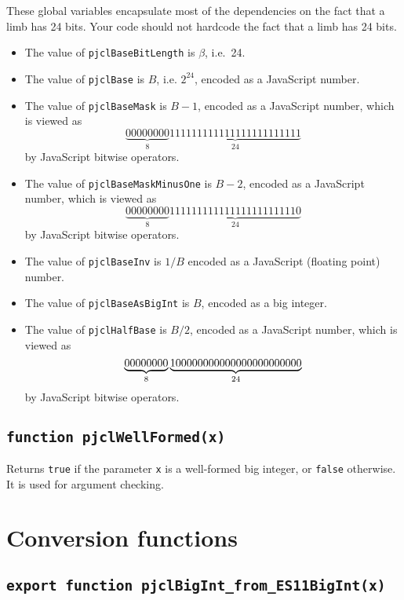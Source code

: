 \documentclass[12pt]{article}
\begin{document}
These global variables encapsulate most of the dependencies on the
fact that a limb has 24 bits.  Your code should not hardcode the fact
that a limb has 24 bits.
\begin{itemize}

\item The value of {\tt pjclBaseBitLength} is $\beta$, i.e.\ 24.

\item The value of {\tt pjclBase} is $B$, i.e. $2^{24}$, encoded as a JavaScript number.

\item The value of {\tt pjclBaseMask} is $B-1$, encoded as a JavaScript number,
which is viewed as
$$
\underbrace{00000000}_8\underbrace{111111111111111111111111}_{24}
$$
by JavaScript bitwise operators.

\item The value of {\tt pjclBaseMaskMinusOne} is $B-2$, encoded as a JavaScript number,
which is viewed as
$$
\underbrace{00000000}_8\underbrace{111111111111111111111110}_{24}
$$
by JavaScript bitwise operators.

\item The value of {\tt pjclBaseInv} is $1/B$ encoded as a JavaScript (floating point) number.

\item The value of {\tt pjclBaseAsBigInt} is $B$, encoded as a big integer.

\item The value of {\tt pjclHalfBase} is $B/2$, encoded as a JavaScript number,
which is viewed as
$$
\underbrace{00000000}_8\underbrace{100000000000000000000000\tt }_{24}
$$
by JavaScript bitwise operators.

\end{itemize}

\subsection{\tt function pjclWellFormed(x)}

Returns {\tt true} if the parameter {\tt x} is a well-formed big
integer, or {\tt false} otherwise.  It is used for argument checking.

\section{Conversion functions}

\subsection{\tt export function pjclBigInt_from_ES11BigInt(x)}
\end{document}
